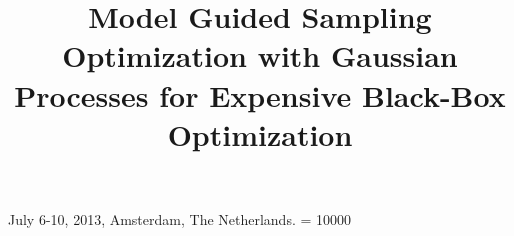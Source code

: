\documentclass{sig-alt-release2}
\begin{document}
%
 {July 6-10, 2013, Amsterdam, The Netherlands.}
\widowpenalty = 10000


\title{Model Guided Sampling Optimization with Gaussian Processes for Expensive Black-Box Optimization}
%
%
%
%
%
\end{document}
